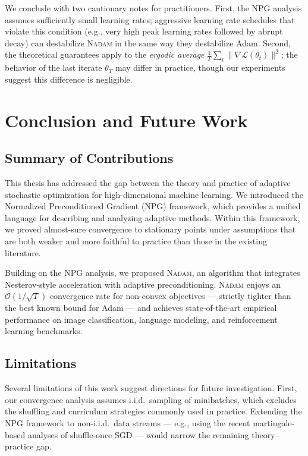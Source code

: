 \documentclass[11pt,twoside,openright]{book}
\begin{document}
We conclude with two cautionary notes for practitioners. First, the NPG analysis assumes
sufficiently small learning rates; aggressive learning rate schedules that violate this
condition (e.g., very high peak learning rates followed by abrupt decay) can destabilize
\textsc{Nadam} in the same way they destabilize Adam. Second, the theoretical guarantees apply
to the \emph{ergodic average} $\frac{1}{T}\sum_t \|\nabla\mathcal{L}(\theta_t)\|^2$; the
behavior of the last iterate $\theta_T$ may differ in practice, though our experiments suggest
this difference is negligible.


\chapter{Conclusion and Future Work}

\section{Summary of Contributions}

This thesis has addressed the gap between the theory and practice of adaptive stochastic
optimization for high-dimensional machine learning. We introduced the Normalized Preconditioned
Gradient (NPG) framework, which provides a unified language for describing and analyzing
adaptive methods. Within this framework, we proved almost-sure convergence to stationary points
under assumptions that are both weaker and more faithful to practice than those in the existing
literature.

Building on the NPG analysis, we proposed \textsc{Nadam}, an algorithm that integrates
Nesterov-style acceleration with adaptive preconditioning. \textsc{Nadam} enjoys an
$\mathcal{O}(1/\sqrt{T})$ convergence rate for non-convex objectives — strictly tighter than
the best known bound for Adam — and achieves state-of-the-art empirical performance on image
classification, language modeling, and reinforcement learning benchmarks.

\section{Limitations}

Several limitations of this work suggest directions for future investigation. First, our
convergence analysis assumes i.i.d.\ sampling of minibatches, which excludes the shuffling and
curriculum strategies commonly used in practice. Extending the NPG framework to non-i.i.d.\
data streams — e.g., using the recent martingale-based analyses of shuffle-once SGD — would
narrow the remaining theory--practice gap.
\end{document}
